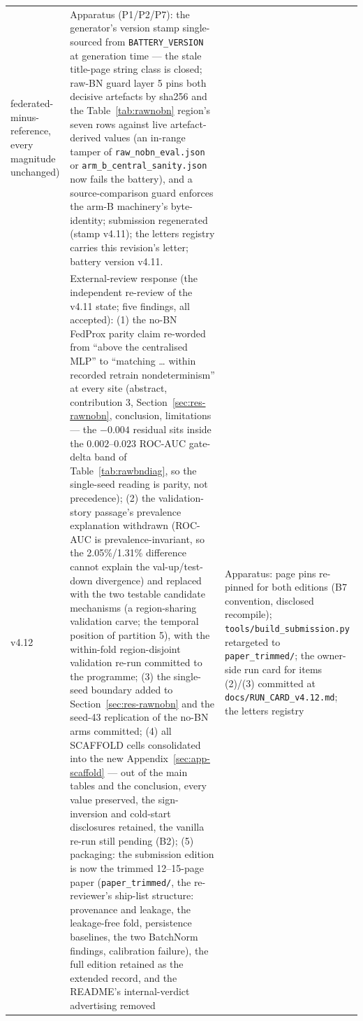 \begin{longtable}{@{}p{} >{\raggedright\arraybackslash}p{} >{\raggedright\arraybackslash}p{}@{}}
federated-minus-reference, every magnitude unchanged) & Apparatus
(P1/P2/P7): the generator's version stamp single-sourced from
\texttt{BATTERY\_VERSION} at generation time — the stale title-page
string class is closed; raw-BN guard layer 5 pins both decisive
artefacts by sha256 and the Table~\ref{tab:rawnobn} region's seven
rows against live artefact-derived values (an in-range tamper of
\texttt{raw\_nobn\_eval.json} or \texttt{arm\_b\_central\_sanity.json}
now fails the battery), and a source-comparison guard enforces the
arm-B machinery's byte-identity; submission regenerated (stamp
v4.11); the letters registry carries this revision's letter; battery
version v4.11. \\
v4.12 & External-review response (the independent re-review of the
v4.11 state; five findings, all accepted): (1) the no-BN FedProx
parity claim re-worded from ``above the centralised MLP'' to
``matching \ldots{} within recorded retrain nondeterminism'' at
every site (abstract, contribution 3, Section~\ref{sec:res-rawnobn},
conclusion, limitations --- the $-0.004$ residual sits inside the
$0.002$--$0.023$ ROC-AUC gate-delta band of
Table~\ref{tab:rawbndiag}, so the single-seed reading is parity,
not precedence); (2) the validation-story passage's prevalence
explanation withdrawn (ROC-AUC is prevalence-invariant, so the
2.05\%/1.31\% difference cannot explain the val-up/test-down
divergence) and replaced with the two testable candidate mechanisms
(a region-sharing validation carve; the temporal position of
partition 5), with the within-fold region-disjoint validation re-run
committed to the programme; (3) the single-seed boundary added to
Section~\ref{sec:res-rawnobn} and the seed-43 replication of the
no-BN arms committed; (4) all SCAFFOLD cells consolidated into the
new Appendix~\ref{sec:app-scaffold} --- out of the main tables and
the conclusion, every value preserved, the sign-inversion and
cold-start disclosures retained, the vanilla re-run still pending
(B2); (5) packaging: the submission edition is now the trimmed
12--15-page paper (\texttt{paper\_trimmed/}, the re-reviewer's
ship-list structure: provenance and leakage, the leakage-free fold,
persistence baselines, the two BatchNorm findings, calibration
failure), the full edition retained as the extended record, and the
README's internal-verdict advertising removed & Apparatus: page pins
re-pinned for both editions (B7 convention, disclosed recompile);
\texttt{tools/build\_submission.py} retargeted to
\texttt{paper\_trimmed/}; the owner-side run card for items (2)/(3)
committed at \texttt{docs/RUN\_CARD\_v4.12.md}; the letters registry

\end{longtable}
